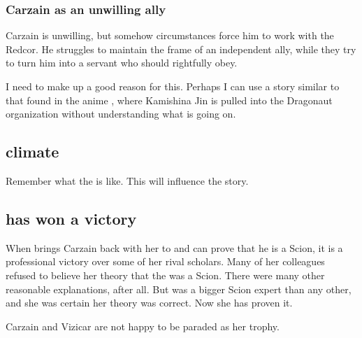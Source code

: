 \begin{garbage}






\subsubsection{Carzain as an unwilling ally}
Carzain is unwilling, but somehow circumstances force him to work with the Redcor. He struggles to maintain the frame of an independent ally, while they try to turn him into a servant who should rightfully obey. 

I need to make up a good reason for this. Perhaps I can use a story similar to that found in the anime \cite{Anime:Dragonaut}, where Kamishina Jin is pulled into the Dragonaut organization without understanding what is going on. 










\subsection{\Redcean{} climate}
Remember what the  is like. 
This will influence the story. 









\subsection{\Esmerel{} has won a victory}
When \Esmerel{} brings Carzain back with her to \Redce{} and can prove that he is a Scion, it is a professional victory over some of her rival scholars.
Many of her colleagues refused to believe her theory that the \spike{} was a Scion. 
There were many other reasonable explanations, after all. 
But \Esmerel{} was a bigger Scion expert than any other, and she was certain her theory was correct. 
Now she has proven it. 

Carzain and Vizicar are not happy to be paraded as her trophy. 










\end{garbage}
